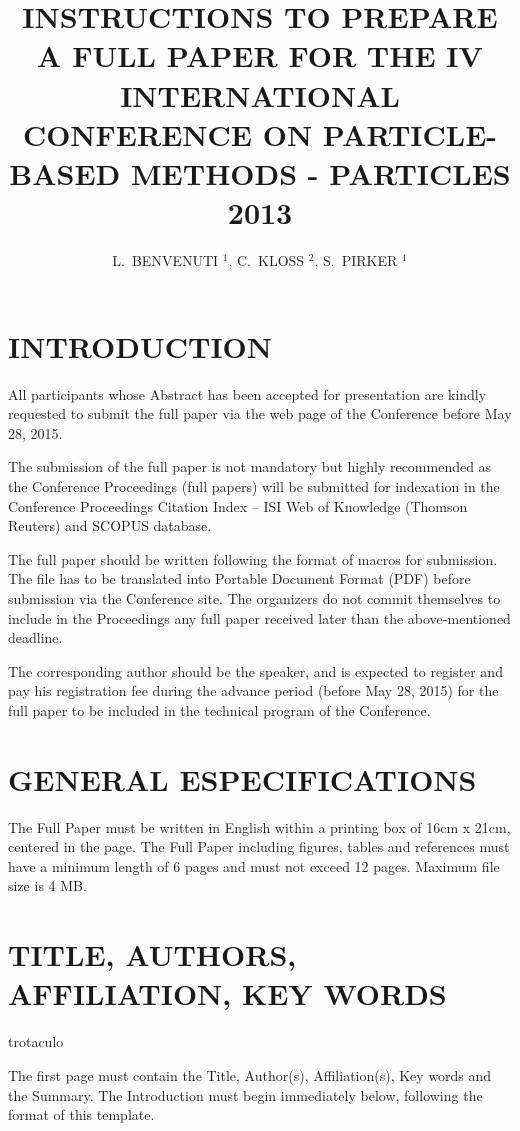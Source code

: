 \documentclass{particles2015}
\title{INSTRUCTIONS TO PREPARE A FULL PAPER FOR THE IV INTERNATIONAL CONFERENCE ON PARTICLE-BASED METHODS - PARTICLES 2013}
\author{L.~BENVENUTI $^{1}$, C.~KLOSS $^{2}$, S.~PIRKER $^{1}$}
\begin{document}

\section{INTRODUCTION}

All participants whose Abstract has been accepted for presentation are kindly requested to submit the full paper via the web page of the Conference before May 28, 2015.

The submission of the full paper is not mandatory but highly recommended as the Conference Proceedings (full papers) will be submitted for indexation in the Conference Proceedings Citation Index – ISI Web of Knowledge (Thomson Reuters) and SCOPUS database.

The full paper should be written following the format of macros for submission. The file has to be translated into Portable Document Format (PDF) before submission via the Conference site. The organizers do not commit themselves to include in the Proceedings any full paper received later than the above-mentioned deadline.

The corresponding author should be the speaker, and is expected to register and pay his registration fee during the advance period (before May 28, 2015) for the full paper to be included in the technical program of the Conference.


\section{GENERAL ESPECIFICATIONS}

The Full Paper must be written in English within a printing box of 16cm x 21cm, centered in the page. The Full Paper including figures, tables and references must have a minimum length of 6 pages and must not exceed 12 pages. Maximum file size is 4 MB.

\section{TITLE, AUTHORS, AFFILIATION, KEY WORDS}

trotaculo 

The first page must contain the Title, Author(s), Affiliation(s),
Key words and the Summary. The Introduction must begin immediately
below, following the format of this template.
\end{document}

